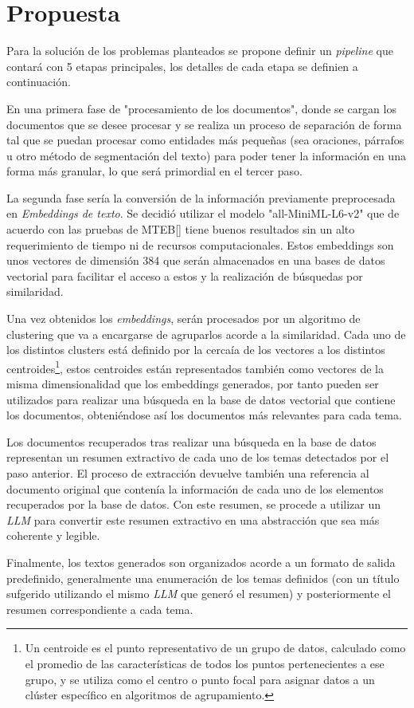 \chapter{Propuesta}\label{chapter:proposal}
    Para la solución de los problemas planteados se propone definir un \emph{pipeline} que contará con 5 etapas principales, los detalles de cada etapa se definien a continuación.

    En una primera fase de "procesamiento de los documentos", donde se cargan los documentos que se desee procesar y se realiza un proceso de separación de forma tal que se puedan procesar como entidades más pequeñas (sea oraciones, párrafos u otro método de segmentación del texto) para poder tener la información en una forma más granular, lo que será primordial en el tercer paso.
    
    La segunda fase sería la conversión de la información previamente preprocesada en \emph{Embeddings de texto}. Se decidió utilizar el modelo "all-MiniML-L6-v2" que de acuerdo con las pruebas de MTEB[\cite{leaderboard}] tiene buenos resultados sin un alto requerimiento de tiempo ni de recursos computacionales. Estos embeddings son unos vectores de dimensión 384 que serán almacenados en una bases de datos vectorial para facilitar el acceso a estos y la realización de búsquedas por similaridad.

    Una vez obtenidos los \emph{embeddings}, serán procesados por un algoritmo de clustering que va a encargarse de agruparlos acorde a la similaridad. Cada uno de los distintos clusters está definido por la cercaía de los vectores a los distintos centroides\footnote{Un centroide es el punto representativo de un grupo de datos, calculado como el promedio de las características de todos los puntos pertenecientes a ese grupo, y se utiliza como el centro o punto focal para asignar datos a un clúster específico en algoritmos de agrupamiento.}, estos centroides están representados también como vectores de la misma dimensionalidad que los embeddings generados, por tanto pueden ser utilizados para realizar una búsqueda en la base de datos vectorial que contiene los documentos, obteniéndose así los documentos más relevantes para cada tema.

    Los documentos recuperados tras realizar una búsqueda en la base de datos representan un resumen extractivo de cada uno de los temas detectados por el paso anterior. El proceso de extracción devuelve también una referencia al documento original que contenía la información de cada uno de los elementos recuperados por la base de datos. Con este resumen, se procede a utilizar un \emph{LLM} para convertir este resumen extractivo en una abstracción que sea más coherente y legible.

    Finalmente, los textos generados son organizados acorde a un formato de salida predefinido, generalmente una enumeración de los temas definidos (con un título sufgerido utilizando el mismo \emph{LLM} que generó el resumen) y posteriormente el resumen correspondiente a cada tema.
